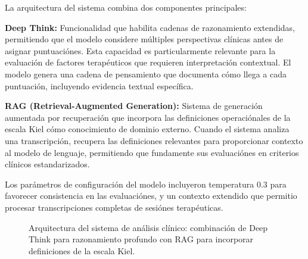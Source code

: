 \documentclass[12pt,a4paper,twoside]{book}
\begin{document}
La arquitectura del sistema combina dos componentes principales:

\textbf{Deep Think:} Funcionalidad que habilita cadenas de razonamiento extendidas, permitiendo que el modelo considere múltiples perspectivas clínicas antes de asignar puntuaciónes. Esta capacidad es particularmente relevante para la evaluación de factores terapéuticos que requieren interpretación contextual. El modelo genera una cadena de pensamiento que documenta cómo llega a cada puntuación, incluyendo evidencia textual específica.

\textbf{RAG (Retrieval-Augmented Generation):} Sistema de generación aumentada por recuperación \cite{lewis2020rag, wu2025rag} que incorpora las definiciones operaciónales de la escala Kiel cómo conocimiento de dominio externo. Cuando el sistema analiza una transcripción, recupera las definiciones relevantes para proporcionar contexto al modelo de lenguaje, permitiendo que fundamente sus evaluaciónes en criterios clínicos estandarizados.

Los parámetros de configuración del modelo incluyeron temperatura 0.3 para favorecer consistencia en las evaluaciónes, y un contexto extendido que permitio procesar transcripciones completas de sesiónes terapéuticas.

\begin{figure}[h]
\centering
{}
\caption{Arquitectura del sistema de análisis clínico: combinación de Deep Think para razonamiento profundo con RAG para incorporar definiciones de la escala Kiel.}
\label{fig:clínical_system}
\end{figure}
\end{document}
